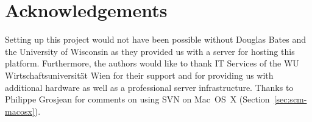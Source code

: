 \documentclass[a4paper]{article}
\let\code=\texttt
\let\email=\texttt
\newcommand{\pkg}[1]{{\normalfont\fontseries{b}\selectfont #1}}
\begin{document}


\section{Acknowledgements}

Setting up this project would not have been possible without Douglas
Bates and the University of Wisconsin as they provided us with a
server for hosting this platform. Furthermore, the authors would like
to thank IT Services of the WU Wirtschaftsuniversit\"at Wien for their
support and for providing us with additional hardware as well as a
professional server infrastructure.  Thanks to Philippe Grosjean for
comments on using SVN on Mac~OS~X (Section~\ref{sec:scm-macosx}).




\end{document}
